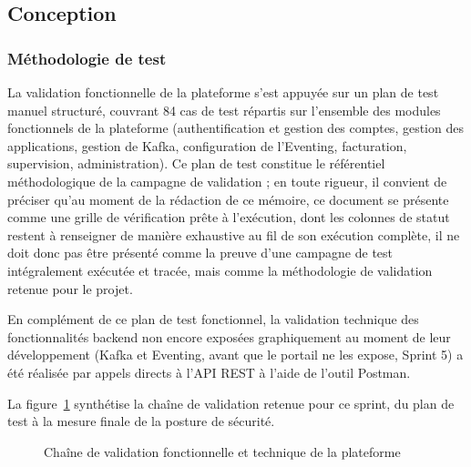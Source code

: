 \subsection{Conception}

\subsubsection{Méthodologie de test}

La validation fonctionnelle de la plateforme s'est appuyée sur un plan de test manuel structuré, couvrant 84 cas de test répartis sur l'ensemble des modules fonctionnels de la plateforme (authentification et gestion des comptes, gestion des applications, gestion de Kafka, configuration de l'Eventing, facturation, supervision, administration). Ce plan de test constitue le référentiel méthodologique de la campagne de validation ; en toute rigueur, il convient de préciser qu'au moment de la rédaction de ce mémoire, ce document se présente comme une grille de vérification prête à l'exécution, dont les colonnes de statut restent à renseigner de manière exhaustive au fil de son exécution complète, il ne doit donc pas être présenté comme la preuve d'une campagne de test intégralement exécutée et tracée, mais comme la méthodologie de validation retenue pour le projet.

En complément de ce plan de test fonctionnel, la validation technique des fonctionnalités backend non encore exposées graphiquement au moment de leur développement (Kafka et Eventing, avant que le portail ne les expose, Sprint 5) a été réalisée par appels directs à l'API REST à l'aide de l'outil Postman.

La figure~\ref{fig:sprint11-strategie-validation} synthétise la chaîne de validation retenue pour ce sprint, du plan de test à la mesure finale de la posture de sécurité.

\begin{figure}[H]
    \centering
    \caption{Chaîne de validation fonctionnelle et technique de la plateforme}
    \label{fig:sprint11-strategie-validation}
\end{figure}

